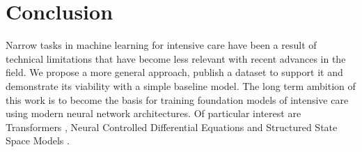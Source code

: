 \newpage
\section{Conclusion}

Narrow tasks in machine learning for intensive care have been a result of technical limitations that have become less relevant with recent advances in the field. 
We propose a more general approach, publish a dataset to support it and demonstrate its viability with a simple baseline model.
The long term ambition of this work is to become the basis for training foundation models of intensive care using modern neural network architectures.
Of particular interest are Transformers \cite{vaswaniAttentionAllYou2023}, Neural Controlled Differential Equations \cite{kidgerNeuralControlledDifferential2020} and Structured State Space Models \cite{guEfficientlyModelingLong2022}.